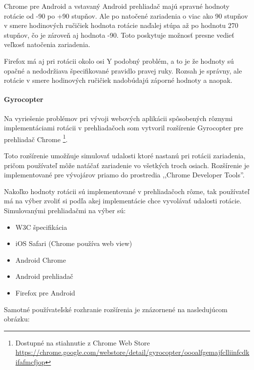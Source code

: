 Chrome pre Android a vstavaný Android prehliadač majú spravné hodnoty rotácie od -90 po +90 stupňov. Ale po natočené zariadenia o viac ako 90 stupňov v smere hodinových ručičiek hodnota rotácie naďalej stúpa až po hodnotu 270 stupňov, čo je zároveň aj hodnota -90. Toto poskytuje možnosť presne vedieť veľkosť natočenia zariadenia.

Firefox má aj pri rotácii okolo osi Y podobný problém, a to je že hodnoty sú opačné a nedodržiava špecifikované pravidlo pravej ruky. Rozsah je správny, ale rotácie v smere hodinových ručičiek nadobúdajú záporné hodnoty a naopak.



\paragraph{Gyrocopter} %
\label{par:gyrocopter}

Na vyriešenie problémov pri vývoji webových aplikácii spôsobených rôznymi implementáciami rotácii v prehliadačoch som vytvoril rozšírenie Gyrocopter pre prehliadač Chrome \footnote{Dostupné na stiahnutie z Chrome Web Store \url{https://chrome.google.com/webstore/detail/gyrocopter/oooalfgemajfclliinfcdkifafmcfjop}}.

Toto rozšírenie umožňuje simulovať udalosti ktoré nastanú pri rotácii zariadenia, pričom používateľ môže natáčať zariadenie vo všetkých troch osiach. Rozšírenie je implementované pre vývojárov priamo do prostredia ,,Chrome Developer Tools''.

Nakoľko hodnoty rotácii sú implementované v prehliadačoch rôzne, tak používateľ má na výber zvoliť si podľa akej implementácie chce vyvolávať udalosti rotácie. Simulovanými prehliadačmi na výber sú:

\begin{itemize}
  \item W3C špecifikácia
  \item iOS Safari (Chrome používa web view)
  \item Android Chrome
  \item Android prehliadač
  \item Firefox pre Android
\end{itemize}

Samotné používateľské rozhranie rozšírenia je znázornené na nasledujúcom obrázku:

